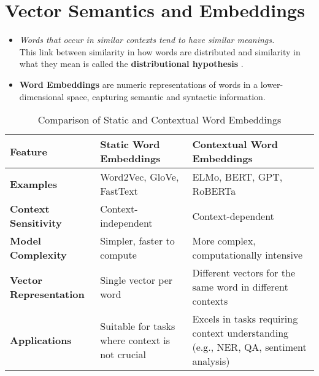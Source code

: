 \chapter{Vector Semantics and Embeddings \cite{nlp-1}}

\begin{itemize}
    \item \textit{Words that occur in similar contexts tend to have similar meanings.}\\ This link between similarity in how words are distributed and similarity in what they mean is called the \textbf{distributional hypothesis} .

    \item \textbf{Word Embeddings} are numeric representations of words in a lower-dimensional space, capturing semantic and syntactic information. \cite{gfg-word-embeddings-in-nlp}
    
\end{itemize}

\begin{table}[h!]
    \centering
    \begin{tabular}{|p{3cm}|p{5cm}|p{5cm}|}
        \hline
        \textbf{Feature} & \textbf{Static Word Embeddings} & \textbf{Contextual Word Embeddings} \\
        \hline
        \textbf{Examples} & Word2Vec, GloVe, FastText & ELMo, BERT, GPT, RoBERTa \\
        \hline
        \textbf{Context Sensitivity} & Context-independent & Context-dependent \\
        \hline
        \textbf{Model Complexity} & Simpler, faster to compute & More complex, computationally intensive \\
        \hline
        \textbf{Vector Representation} & Single vector per word & Different vectors for the same word in different contexts \\
        \hline
        \textbf{Applications} & Suitable for tasks where context is not crucial & Excels in tasks requiring context understanding (e.g., NER, QA, sentiment analysis) \\
        \hline
    \end{tabular}
    \caption{Comparison of Static and Contextual Word Embeddings \cite{chatgpt}}
\end{table}

